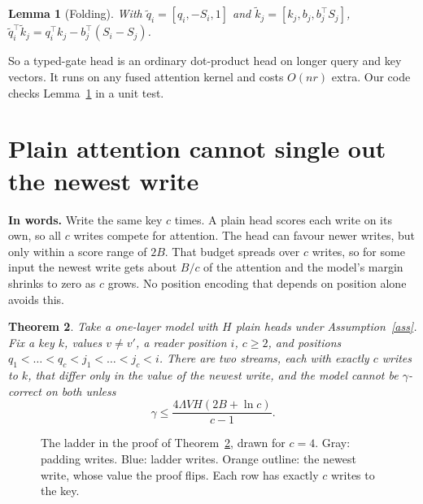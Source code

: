 \documentclass[10pt]{article}
\newtheorem{theorem}{Theorem}
\newtheorem{lemma}[theorem]{Lemma}
\theoremstyle{definition}
\theoremstyle{remark}
\newcommand{\inwords}[1]{\par\smallskip\noindent\textbf{In words.} #1\par\smallskip}
\begin{document}
\begin{lemma}[Folding]\label{lem:fold}
With $\tilde q_i = [q_i, -S_i, 1]$ and $\tilde k_j = [k_j, b_j, b_j^\top S_j]$, $\tilde q_i^\top \tilde k_j = q_i^\top k_j - b_j^\top (S_i - S_j)$.
\end{lemma}

So a typed-gate head is an ordinary dot-product head on longer query and key vectors. It runs on any fused attention kernel and costs $O(nr)$ extra. Our code checks Lemma~\ref{lem:fold} in a unit test.

\section{Plain attention cannot single out the newest write}\label{sec:plain}

\inwords{Write the same key $c$ times. A plain head scores each write on its own, so all $c$ writes compete for attention. The head can favour newer writes, but only within a score range of $2B$. That budget spreads over $c$ writes, so for some input the newest write gets about $B/c$ of the attention and the model's margin shrinks to zero as $c$ grows. No position encoding that depends on position alone avoids this.}

\begin{theorem}\label{thm:plain}
Take a one-layer model with $H$ plain heads under Assumption~\ref{ass}. Fix a key $k$, values $v \ne v'$, a reader position $i$, $c \ge 2$, and positions $q_1 < \dots < q_c < j_1 < \dots < j_c < i$. There are two streams, each with exactly $c$ writes to $k$, that differ only in the value of the newest write, and the model cannot be $\gamma$-correct on both unless
\[
\gamma \le \frac{4 \Lambda V H (2B + \ln c)}{c - 1}.
\]
\end{theorem}

\begin{figure}[t]
\centering
{}
\caption{The ladder in the proof of Theorem~\ref{thm:plain}, drawn for $c = 4$. Gray: padding writes. Blue: ladder writes. Orange outline: the newest write, whose value the proof flips. Each row has exactly $c$ writes to the key.}
\label{fig:ladder}
\end{figure}
\end{document}
